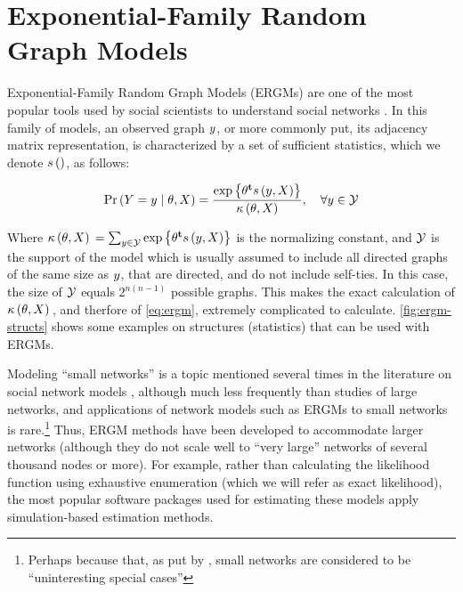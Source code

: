 \documentclass[12pt]{article}
\begin{document}
\section{Exponential-Family Random Graph Models}

Exponential-Family Random Graph Models (ERGMs) are one of the most popular tools used by social scientists to understand social networks  \cite[and others]{Robins2007,Holland1981,Wasserman1996,Snijders2006}. In this family of models, an observed graph $y$, or more commonly put, its adjacency matrix representation, is characterized by a set of sufficient statistics, which we denote $s\left(\right)$, as follows:

\begin{equation}
\label{eq:ergm}
  \Prcond{\Adjmat = \adjmat}{\params, \Indepvar} = \frac{%
  	\exp{\transpose{\params}\sufstats{\adjmat, \Indepvar}}%
  }{
  	\kappa\left(\params, \Indepvar\right)
  },\quad\forall \adjmat\in\ADJMAT
\end{equation}

\noindent Where $\kappa\left(\theta, X\right){} = \sum_{y\in\mathcal{Y}}\mbox{exp}\left\{{\theta}^\mathbf{t}s\left(y, X\right)\right\}$ is the normalizing constant, and $\mathcal{Y}$ is the support of the model which is usually assumed to include all directed graphs of the same size as $y$, that are directed, and do not include self-ties. In this case, the size of $\mathcal{Y}$ equals $2^{n(n-1)}$ possible graphs. This makes the exact calculation of $\kappa\left(\theta, X\right){}$, and therfore of \eqref{eq:ergm}, extremely complicated to calculate. \autoref{fig:ergm-structs} shows some examples on structures (statistics) that can be used with ERGMs.

Modeling ``small networks'' is a topic mentioned several times in the literature on social network models  \cite{Wasserman1996,Frank1986,Snijders2011},  although much less frequently than studies of large networks, and applications of network models such as ERGMs to small networks is rare.\footnote{Perhaps because that, as put by \cite{Snijders2011}, small networks are considered to be ``uninteresting special cases''} Thus, ERGM methods have been developed to accommodate larger networks (although they do not scale well to ``very large'' networks of several thousand nodes or more). For example, rather than calculating the likelihood function using exhaustive enumeration (which we will refer as exact likelihood), the most popular software packages used for estimating these models apply simulation-based estimation methods.
\end{document}
